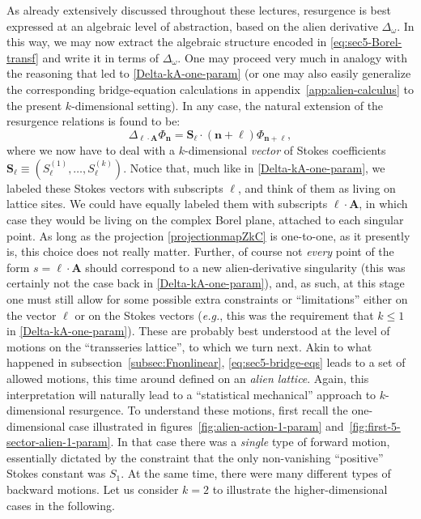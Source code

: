 \documentclass[11pt,a4paper]{article}
\begin{document}
As already extensively discussed throughout these lectures, resurgence is best expressed at an algebraic level of abstraction, based on the alien derivative $\Delta_{\omega}$. In this way, we may now extract the algebraic structure encoded in \eqref{eq:sec5-Borel-transf} and write it in terms of $\Delta_{\omega}$. One may proceed very much in analogy with the reasoning that led to \eqref{Delta-kA-one-param} (or one may also easily generalize the corresponding bridge-equation calculations in appendix~\ref{app:alien-calculus} to the present $k$-dimensional setting). In any case, the natural extension of the resurgence relations is found to be:
%
\begin{equation}
\label{eq:sec5-bridge-eqs}
\Delta_{\boldsymbol{\ell} \cdot \boldsymbol{A}} \Phi_{\boldsymbol{n}} = \boldsymbol{S}_{\boldsymbol{\ell}} \cdot \left(\boldsymbol{n}+\boldsymbol{\ell}\right) \Phi_{\boldsymbol{n}+\boldsymbol{\ell}},
\end{equation}
%
\noindent
where we now have to deal with a $k$-dimensional \textit{vector} of Stokes coefficients $\boldsymbol{S}_{\boldsymbol{\ell}} \equiv ( S_{\boldsymbol{\ell}}^{(1)}, \ldots, S_{\boldsymbol{\ell}}^{(k)} )$. Notice that, much like in \eqref{Delta-kA-one-param}, we labeled these Stokes vectors with subscripts $\boldsymbol{\ell}$, and think of them as living on lattice sites. We could have equally labeled them with subscripts $\boldsymbol{\ell} \cdot \boldsymbol{A}$, in which case they would be living on the complex Borel plane, attached to each singular point. As long as the projection \eqref{projectionmapZkC} is one-to-one, as it presently is, this choice does not really matter. Further, of course not \textit{every} point of the form $s = \boldsymbol{\ell} \cdot \boldsymbol{A}$ should correspond to a new alien-derivative singularity (this was certainly not the case back in \eqref{Delta-kA-one-param}), and, as such, at this stage one must still allow for some possible extra constraints or ``limitations'' either on the vector $\boldsymbol{\ell}$ or on the Stokes vectors (\textit{e.g.}, this was the requirement that $k \leq 1$ in \eqref{Delta-kA-one-param}). These are probably best understood at the level of motions on the ``transseries lattice'', to which we turn next. Akin to what happened in subsection~\ref{subsec:Fnonlinear}, \eqref{eq:sec5-bridge-eqs} leads to a set of allowed motions, this time around defined on an \textit{alien lattice}. Again, this interpretation will naturally lead to a ``statistical mechanical'' approach to $k$-dimensional resurgence. To understand these motions, first recall the one-dimensional case illustrated in figures~\ref{fig:alien-action-1-param} and~\ref{fig:first-5-sector-alien-1-param}. In that case there was a \textit{single} type of  forward motion, essentially dictated by the constraint that the only non-vanishing ``positive'' Stokes constant was $S_1$. At the same time, there were many different types of backward motions. Let us consider $k=2$ to illustrate the higher-dimensional cases in the following.
\end{document}
